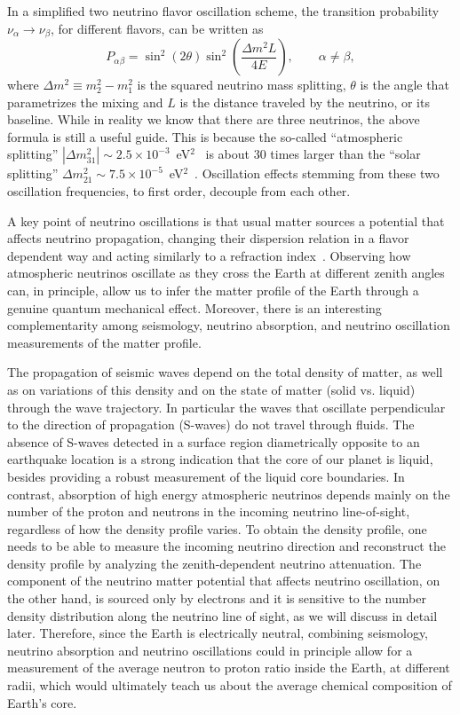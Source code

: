 In a simplified two neutrino flavor oscillation scheme, the transition probability $\nu_\alpha\to\nu_\beta$, for different flavors, can be written as
\begin{equation}
  P_{\alpha \beta} = \sin^2(2\theta)\sin^2\left(\frac{\Delta m^2 L}{4E}\right),\qquad \alpha\neq\beta,
\end{equation}
where $\Delta m^2 \equiv m_2^2-m_1^2$ is the squared neutrino mass splitting, $\theta$ is the angle that parametrizes the mixing and $L$ is the distance traveled by the neutrino, or its baseline. 
While in reality we know that there are three neutrinos, the above formula is still a useful guide.
This is because the so-called ``atmospheric splitting''  $|\Delta m^2_{31}|\sim 2.5\times10^{-3}$~eV$^2$~\cite{DayaBay:2018yms, NOvA:2019cyt, T2K:2021xwb} is about 30 times larger than the ``solar splitting'' $\Delta m^2_{21}\sim7.5\times10^{-5}$~eV$^2$~\cite{KamLAND:2013rgu, yasuhiro_nakajima_2020_4134680}.
Oscillation effects stemming from these two oscillation frequencies, to first order, decouple from each other.

A key point of neutrino oscillations is that usual matter sources a potential that affects neutrino propagation, changing their dispersion relation in a flavor dependent way and acting similarly to a refraction index~\cite{Wolfenstein:1977ue, Mikheyev:1985zog, Mikheev:1986wj}.
Observing how atmospheric neutrinos oscillate as they cross the Earth at different zenith angles can, in principle, allow us to infer the matter profile of the Earth through a genuine quantum mechanical effect.
Moreover, there is an interesting  complementarity among seismology, neutrino absorption, and neutrino oscillation measurements of the matter profile.

The propagation of seismic waves depend on the total density of matter, as well  as on variations of this density and on the state of matter (solid vs. liquid) through the wave trajectory.
In particular the waves that oscillate perpendicular to the direction of propagation (S-waves) do not travel through fluids.
The absence of S-waves detected in a surface region diametrically opposite to an earthquake location is a strong indication that the core of our planet is liquid, besides providing a robust measurement of the liquid core boundaries.
In contrast, absorption of high energy atmospheric neutrinos depends mainly on the number of the proton and neutrons in the incoming neutrino line-of-sight, regardless of how the density profile varies.
To obtain the density profile, one needs to be able to measure the incoming neutrino direction and reconstruct the density profile by analyzing the  zenith-dependent neutrino attenuation.
The component of the neutrino matter potential that affects neutrino oscillation, on the other hand, is sourced only by electrons and it is sensitive to the number density distribution along the neutrino line of sight, as we will discuss in detail later.
Therefore, since the Earth is electrically neutral, combining seismology, neutrino absorption and neutrino oscillations could in principle allow for a measurement of the average neutron to proton ratio inside the Earth, at different radii, which would ultimately teach us about the average chemical composition of Earth's core.

